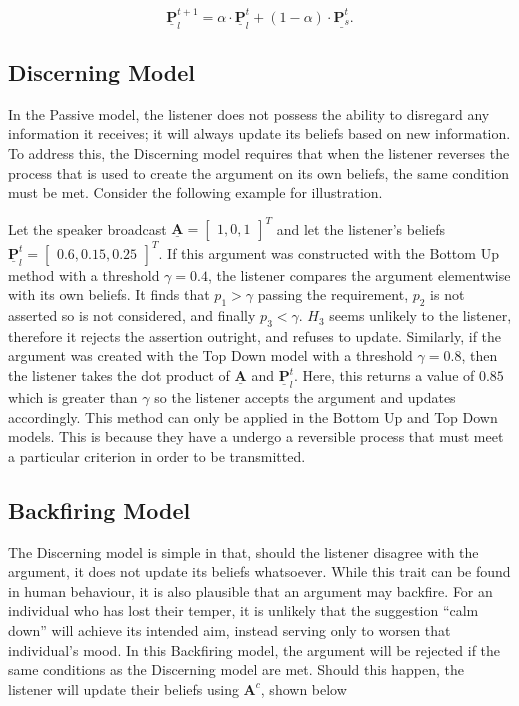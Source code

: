\begin{equation} 
    \underline{\mathbf{P}}^{t+1}_l = \alpha \cdot \underline{\mathbf{P}}^{t}_l + (1 - \alpha) \cdot \underline{\mathbf{P}_s^t} .
\end{equation}


\subsection*{Discerning Model}

In the Passive model, the listener does not possess the ability to disregard any information it receives; it will always update its beliefs based on new information. To address this, the Discerning model requires that when the listener reverses the process that is used to create the argument on its own beliefs, the same condition must be met. Consider the following example for illustration. 

Let the speaker broadcast $\underline{\mathbf{A}} = \begin{bmatrix}
    1,
    0,
    1
\end{bmatrix}^T$
and let the listener's beliefs
$\underline{\mathbf{P}}^t_l = \begin{bmatrix}
    0.6,
    0.15,
    0.25
\end{bmatrix}^T$. If this argument was constructed with the Bottom Up method with a threshold $\gamma = 0.4$, the listener compares the argument elementwise with its own beliefs. It finds that $p_1 > \gamma$ passing the requirement, $p_2$ is not asserted so is not considered, and finally $p_3 < \gamma$. $H_3$ seems unlikely to the listener, therefore it rejects the assertion outright, and refuses to update. Similarly, if the argument was created with the Top Down model with a threshold $\gamma = 0.8$, then the listener takes the dot product of $\underline{\mathbf{A}}$ and $\underline{\mathbf{P}}_l^t$. Here, this returns a value of $0.85$ which is greater than $\gamma$ so the listener accepts the argument and updates accordingly. This method can only be applied in the Bottom Up and Top Down models. This is because they have a undergo a reversible process that must meet a particular criterion in order to be transmitted.

\subsection*{Backfiring Model}

The Discerning model is simple in that, should the listener disagree with the argument, it does not update its beliefs whatsoever. While this trait can be found in human behaviour, it is also plausible that an argument may backfire. For an individual who has lost their temper, it is unlikely that the suggestion ``calm down'' will achieve its intended aim, instead serving only to worsen that individual's mood. In this Backfiring model, the argument will be rejected if the same conditions as the Discerning model are met. Should this happen, the listener will update their beliefs using $\mathbf{A}^c$, shown below

